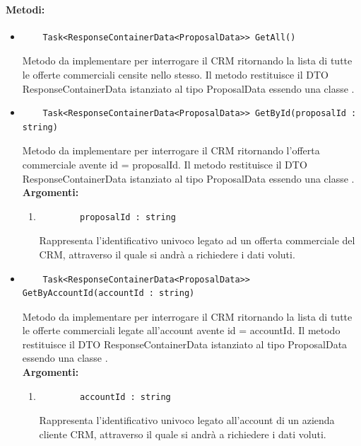 \paragraph{Metodi:}\hfill
\begin{itemize}
	\itemsep0em 
	\item 
	\begin{lstlisting}
	Task<ResponseContainerData<ProposalData>> GetAll()
	\end{lstlisting}
	Metodo da implementare per interrogare il CRM ritornando la lista di tutte le offerte commerciali censite nello stesso. Il metodo restituisce il DTO ResponseContainerData istanziato al tipo ProposalData essendo una classe .\\
	
	\item 
	\begin{lstlisting}
	Task<ResponseContainerData<ProposalData>> GetById(proposalId : string)
	\end{lstlisting}
	Metodo da implementare per interrogare il CRM ritornando l'offerta commerciale avente id = {proposalId}. Il metodo restituisce il DTO ResponseContainerData istanziato al tipo ProposalData essendo una classe .\\
	\textbf{\small Argomenti:}
	\begin{enumerate}[leftmargin=*]
		\itemsep0em 
		\item 
		\begin{lstlisting}
		proposalId : string
		\end{lstlisting}
		Rappresenta l'identificativo univoco legato ad un offerta commerciale del CRM, attraverso il quale si andrà a richiedere i dati voluti.
	\end{enumerate}
	
	\item 
	\begin{lstlisting}
	Task<ResponseContainerData<ProposalData>> GetByAccountId(accountId : string)
	\end{lstlisting}
	Metodo da implementare per interrogare il CRM ritornando la lista di tutte le offerte commerciali legate all'account avente id = {accountId}. Il metodo restituisce il DTO ResponseContainerData istanziato al tipo ProposalData essendo una classe .\\
	\textbf{\small Argomenti:}
	\begin{enumerate}[leftmargin=*]
		\itemsep0em
		\item 
		\begin{lstlisting}
		accountId : string
		\end{lstlisting}
		Rappresenta l'identificativo univoco legato all'account di un azienda cliente CRM, attraverso il quale si andrà a richiedere i dati voluti.
	\end{enumerate}
\end{itemize}
\vfill

